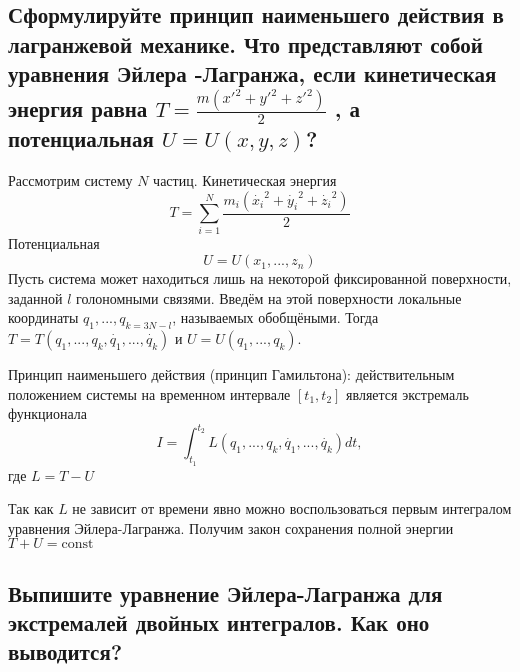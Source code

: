 \documentclass{article}
\begin{document}
\subsection{Сформулируйте принцип наименьшего действия в лагранжевой механике. Что представляют собой уравнения Эйлера -Лагранжа, если кинетическая энергия равна $ T=\frac{m(x'^2+y'^2+z'^2)}{2} $ , а потенциальная $U=U(x, y, z)$?}
Рассмотрим систему $ N $ частиц. 
Кинетическая энергия \[ T=\sum_{i=1}^{N}\frac{m_i(\dot{x_i}^2+\dot{y_i}^2+\dot{z_i}^2)}{2} \]
Потенциальная \[ U=U(x_1,..., z_n) \]
Пусть система может находиться лишь на некоторой фиксированной поверхности, заданной $ l $ голономными связями. 
Введём на этой поверхности локальные координаты $q_1, ..., q_{k=3N-l}$, называемых обобщёными. 
Тогда $ T = T(q_1,..., q_k, \dot{q_1}, ..., \dot{q_k})$ и $ U=U(q_1, ..., q_k) $.

Принцип наименьшего действия (принцип Гамильтона): действительным положением системы на временном интервале $ [t_1, t_2] $ 
является экстремаль функционала \[ I=\int_{t_1}^{t_2} L(q_1,...,q_k,\dot{q_1}, ..., \dot{q_k})dt, \]
где $L=T-U$

Так как $L$ не зависит от времени явно можно воспользоваться первым интегралом уравнения Эйлера-Лагранжа. 
Получим закон сохранения полной энергии $T+U=\text{const}$

\subsection{Выпишите уравнение Эйлера-Лагранжа для экстремалей двойных интегралов. Как оно выводится?}
\end{document}
